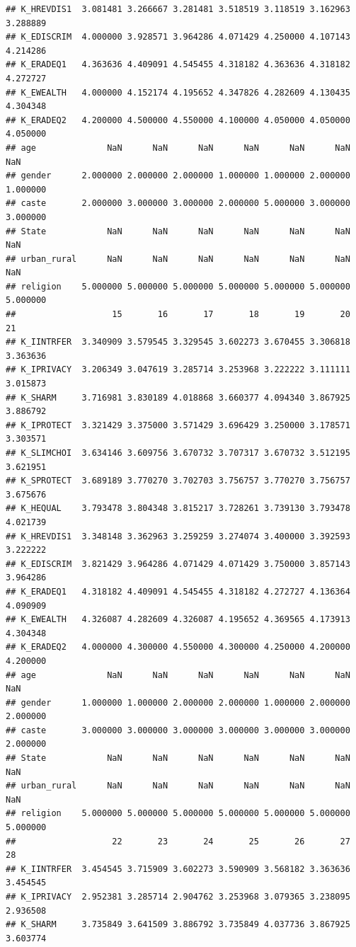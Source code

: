 \documentclass[
]{article}
\begin{document}
\begin{verbatim}
## K_HREVDIS1  3.081481 3.266667 3.281481 3.518519 3.118519 3.162963 3.288889
## K_EDISCRIM  4.000000 3.928571 3.964286 4.071429 4.250000 4.107143 4.214286
## K_ERADEQ1   4.363636 4.409091 4.545455 4.318182 4.363636 4.318182 4.272727
## K_EWEALTH   4.000000 4.152174 4.195652 4.347826 4.282609 4.130435 4.304348
## K_ERADEQ2   4.200000 4.500000 4.550000 4.100000 4.050000 4.050000 4.050000
## age              NaN      NaN      NaN      NaN      NaN      NaN      NaN
## gender      2.000000 2.000000 2.000000 1.000000 1.000000 2.000000 1.000000
## caste       2.000000 3.000000 3.000000 2.000000 5.000000 3.000000 3.000000
## State            NaN      NaN      NaN      NaN      NaN      NaN      NaN
## urban_rural      NaN      NaN      NaN      NaN      NaN      NaN      NaN
## religion    5.000000 5.000000 5.000000 5.000000 5.000000 5.000000 5.000000
##                   15       16       17       18       19       20       21
## K_IINTRFER  3.340909 3.579545 3.329545 3.602273 3.670455 3.306818 3.363636
## K_IPRIVACY  3.206349 3.047619 3.285714 3.253968 3.222222 3.111111 3.015873
## K_SHARM     3.716981 3.830189 4.018868 3.660377 4.094340 3.867925 3.886792
## K_IPROTECT  3.321429 3.375000 3.571429 3.696429 3.250000 3.178571 3.303571
## K_SLIMCHOI  3.634146 3.609756 3.670732 3.707317 3.670732 3.512195 3.621951
## K_SPROTECT  3.689189 3.770270 3.702703 3.756757 3.770270 3.756757 3.675676
## K_HEQUAL    3.793478 3.804348 3.815217 3.728261 3.739130 3.793478 4.021739
## K_HREVDIS1  3.348148 3.362963 3.259259 3.274074 3.400000 3.392593 3.222222
## K_EDISCRIM  3.821429 3.964286 4.071429 4.071429 3.750000 3.857143 3.964286
## K_ERADEQ1   4.318182 4.409091 4.545455 4.318182 4.272727 4.136364 4.090909
## K_EWEALTH   4.326087 4.282609 4.326087 4.195652 4.369565 4.173913 4.304348
## K_ERADEQ2   4.000000 4.300000 4.550000 4.300000 4.250000 4.200000 4.200000
## age              NaN      NaN      NaN      NaN      NaN      NaN      NaN
## gender      1.000000 1.000000 2.000000 2.000000 1.000000 2.000000 2.000000
## caste       3.000000 3.000000 3.000000 3.000000 3.000000 3.000000 2.000000
## State            NaN      NaN      NaN      NaN      NaN      NaN      NaN
## urban_rural      NaN      NaN      NaN      NaN      NaN      NaN      NaN
## religion    5.000000 5.000000 5.000000 5.000000 5.000000 5.000000 5.000000
##                   22       23       24       25       26       27       28
## K_IINTRFER  3.454545 3.715909 3.602273 3.590909 3.568182 3.363636 3.454545
## K_IPRIVACY  2.952381 3.285714 2.904762 3.253968 3.079365 3.238095 2.936508
## K_SHARM     3.735849 3.641509 3.886792 3.735849 4.037736 3.867925 3.603774

\end{verbatim}
\end{document}
